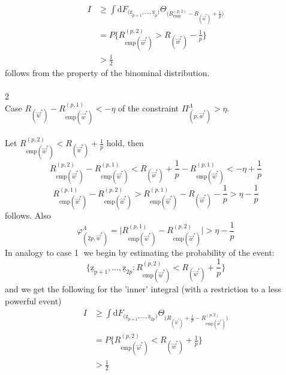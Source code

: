 \begin{equation}
	\begin{array}{ll}
	I
	& \geq \int \mathrm{d} 
		F_{ \big( \mathrm{\underline{z}}_{p + 1}, \ldots,
			\mathrm{\underline{z}}_p \big) } 
		\Theta_{ \big( R_{ \mathrm{emp} }^{ (p, 2) } -
			R_{ ( \vec{w}^* ) } + \frac{1}{p} 
		\big) } \\
	& = P\Bigg\{ R_{ \mathrm{emp} ( \vec{w}^* ) 
			}^{ (p, 2) }
			> R_{ ( \vec{w}^* ) } - \frac{1}{p} 
		\Bigg\} \\
	& > \frac{1}{2}
	\end{array}
\end{equation}
follows from the property of the binominal distribution.\\\\
\textcircled{2}\\
Case $R_{ ( \vec{w}^* ) } - R_{ \mathrm{emp}( \vec{w}^* ) }^{ (p, 1) } < -\eta$ of the constraint $\Pi_{ (p, \vec{w}^* ) }^\Lambda > \eta$.\\\\
Let $R_{ \mathrm{emp}( \vec{w}^* ) }^{ (p, 2) } < R_{ ( \vec{w}^* ) } + \frac{1}{p}$ hold, then
\begin{equation}
	R_{ \mathrm{emp}( \vec{w}^* ) }^{ (p, 2) } 
	- R_{ \mathrm{emp}( \vec{w}^* ) }^{ (p, 1) }
	< R_{ ( \vec{w}^* ) } + \frac{1}{p} 
	- R_{ \mathrm{emp}( \vec{w}^* ) }^{ (p, 1) }
	< -\eta + \frac{1}{p}
\end{equation}
\begin{equation}
	R_{ \mathrm{emp}( \vec{w}^* ) }^{ (p, 1) } 
	- R_{ \mathrm{emp}( \vec{w}^* ) }^{ (p, 2) }
	> R_{ \mathrm{emp}( \vec{w}^* ) }^{ (p, 1) }
	- R_{ ( \vec{w}^* ) } - \frac{1}{p} 
	> \eta - \frac{1}{p}
\end{equation}
follows. Also
\begin{equation}
	\varphi_{ (2p, \vec{w}^* ) }^\Lambda = 
	\Big| R_{ \mathrm{emp}( \vec{w}^* ) }^{ (p, 1) } 
	- R_{ \mathrm{emp}( \vec{w}^* ) }^{ (p, 2) } \Big|
	> \eta - \frac{1}{p}
\end{equation}
In analogy to case \textcircled{1} we begin by estimating the probability of the event:
\begin{equation}
	\Bigg\{ \mathrm{ \underline{z}_{p + 1} }, \ldots, 
		\mathrm{ \underline{z} }_{2p}: 
		R_{ \mathrm{emp}( \vec{w}^* ) }^{ (p, 2) }
		< R_{ ( \vec{w}^* ) } + \frac{1}{p}
	\Bigg\}
\end{equation}
and we get the following for the 'inner' integral (with a restriction to a less powerful event)
\begin{equation}
	\begin{array}{ll}
	I
	& \geq \int \mathrm{d} 
		F_{ \big( \mathrm{\underline{z}}_{p + 1}, \ldots,
			\mathrm{\underline{z}}_{2p} \big) } 
		\Theta_{ \Big( R_{ ( \vec{w}^* ) } 
			+ \frac{1}{p} 
			- R_{ \mathrm{emp} ( \vec{w}^* ) 
				}^{ (p, 2) }
			\Big) } \\
	& = P\Bigg\{ R_{ \mathrm{emp} ( \vec{w}^* ) }
			^{ (p, 2) }
			< R_{ ( \vec{w}^* ) } + \frac{1}{p} 
		\Bigg\} \\
	& > \frac{1}{2}
	\end{array}
\end{equation}
